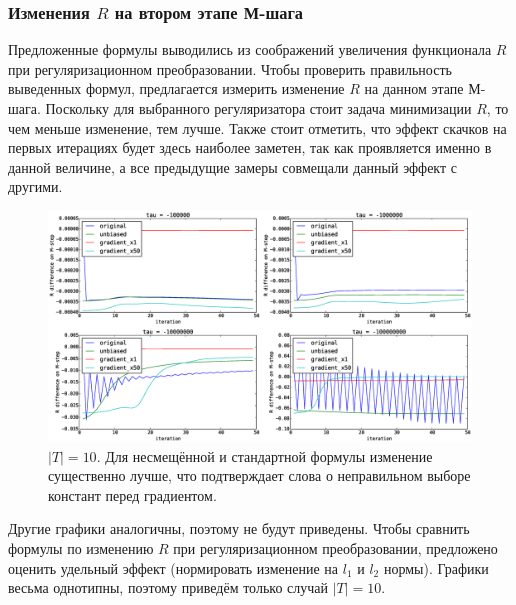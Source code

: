 \documentclass[12pt]{article}
\begin{document}
\subsubsection{Изменения $R$ на втором этапе М-шага}
Предложенные формулы выводились из соображений увеличения функционала $R$ при регуляризационном преобразовании. Чтобы проверить правильность выведенных формул, предлагается измерить изменение $R$ на данном этапе М-шага. Поскольку для выбранного регуляризатора стоит задача минимизации $R$, то чем меньше изменение, тем лучше. Также стоит отметить, что эффект скачков на первых итерациях будет здесь наиболее заметен, так как проявляется именно в данной величине, а все предыдущие замеры совмещали данный эффект с другими.
\begin{figure}[H]
	\centering
	\caption{$|T| = 10$. Для несмещённой и стандартной формулы изменение существенно лучше, что подтверждает слова о неправильном выборе констант перед градиентом.}    
	\includegraphics[width=1.0\linewidth]{pictures/topics_10_RMstepDiff}
\end{figure}

Другие графики аналогичны, поэтому не будут приведены. Чтобы сравнить формулы по изменению $R$ при регуляризационном преобразовании, предложено оценить удельный эффект (нормировать изменение на $l_1$ и $l_2$ нормы). Графики весьма однотипны, поэтому приведём только случай $|T| = 10$.
\end{document}
